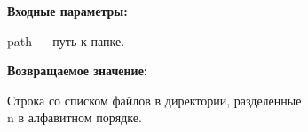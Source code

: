 \textbf{Входные параметры:}

path --- путь к папке.

\textbf{Возвращаемое значение:}

Строка со списком файлов в директории, разделенные \\n в алфавитном порядке.